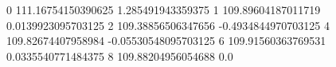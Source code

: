 0 111.16754150390625 1.285491943359375
1 109.89604187011719 0.0139923095703125
2 109.38856506347656 -0.4934844970703125
4 109.82674407958984 -0.05530548095703125
6 109.91560363769531 0.0335540771484375
8 109.88204956054688 0.0
